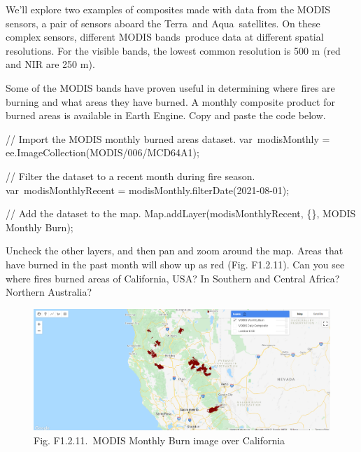 \documentclass[
  letterpaper,
  DIV=11,
  numbers=noendperiod]{scrreprt}
\newenvironment{Shaded}{\begin{snugshade}}{\end{snugshade}}
\newcommand{\BuiltInTok}[1]{\textcolor[rgb]{0.00,0.23,0.31}{#1}}
\newcommand{\CommentTok}[1]{\textcolor[rgb]{0.37,0.37,0.37}{#1}}
\newcommand{\FunctionTok}[1]{\textcolor[rgb]{0.28,0.35,0.67}{#1}}
\newcommand{\NormalTok}[1]{\textcolor[rgb]{0.00,0.23,0.31}{#1}}
\newcommand{\OperatorTok}[1]{\textcolor[rgb]{0.37,0.37,0.37}{#1}}
\newcommand{\StringTok}[1]{\textcolor[rgb]{0.13,0.47,0.30}{#1}}
\begin{document}
We'll explore two examples of composites made with data from the MODIS
sensors, a pair of sensors aboard the Terra~and Aqua~satellites. On
these complex sensors, different MODIS bands~produce data at different
spatial resolutions. For the visible bands, the lowest common resolution
is 500 m (red and NIR are 250 m).

Some of the MODIS bands have proven useful in determining where fires
are burning and what areas they have burned. A monthly composite product
for burned areas is available in Earth Engine. Copy and paste the code
below.

\begin{Shaded}
\begin{Highlighting}[]
\CommentTok{// Import the MODIS monthly burned areas dataset.  }
\NormalTok{var modisMonthly }\OperatorTok{=}\NormalTok{ ee}\OperatorTok{.}\FunctionTok{ImageCollection}\NormalTok{(}\StringTok{\textquotesingle{}MODIS/006/MCD64A1\textquotesingle{}}\NormalTok{)}\OperatorTok{;}  
  
\CommentTok{// Filter the dataset to a recent month during fire season.  }
\NormalTok{var modisMonthlyRecent }\OperatorTok{=}\NormalTok{ modisMonthly}\OperatorTok{.}\FunctionTok{filterDate}\NormalTok{(}\StringTok{\textquotesingle{}2021{-}08{-}01\textquotesingle{}}\NormalTok{)}\OperatorTok{;}  
  
\CommentTok{// Add the dataset to the map.  }
\BuiltInTok{Map}\OperatorTok{.}\FunctionTok{addLayer}\NormalTok{(modisMonthlyRecent}\OperatorTok{,}\NormalTok{ \{\}}\OperatorTok{,} \StringTok{\textquotesingle{}MODIS Monthly Burn\textquotesingle{}}\NormalTok{)}\OperatorTok{;}
\end{Highlighting}
\end{Shaded}

Uncheck the other layers, and then pan and zoom around the map. Areas
that have burned in the past month will show up as red (Fig. F1.2.11).
Can you see where fires burned areas of California, USA? In Southern and
Central Africa? Northern Australia?

\begin{figure}

{\centering \includegraphics{./F1/image19.png}

}

\caption{Fig. F1.2.11.~MODIS Monthly Burn image over California}

\end{figure}
\end{document}

